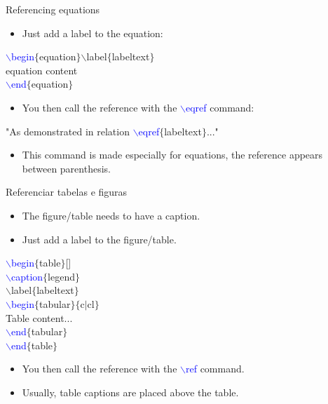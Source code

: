 \documentclass[usenames,dvipsnames,aspectratio=169]{beamer}
\newcommand{\aitem}{\item[$\cdot$]}
\begin{document}
\begin{frame}[t]{Referencing equations}
\begin{itemize}
\aitem Just add a label to the equation:
\end{itemize}
\textcolor{blue}{$\backslash$begin}\textcolor{PineGreen}{$\{$equation$\}$}\textcolor{YellowOrange}{$\backslash$label$\{$labeltext$\}$}\\
\textcolor{PineGreen}{equation content}\\
\textcolor{blue}{$\backslash$end}\textcolor{PineGreen}{$\{$equation$\}$}
\begin{itemize}
\aitem You then call the reference with the \textcolor{blue}{$\backslash$eqref} command:
\end{itemize}
"As demonstrated in relation \textcolor{blue}{$\backslash$eqref}\textcolor{PineGreen}{$\{$labeltext$\}$}..."
\begin{itemize}
\aitem This command is made especially for equations, the reference appears between parenthesis.
\end{itemize}
\end{frame}


\begin{frame}[t]{Referenciar tabelas e figuras}
\begin{itemize}
\aitem The figure/table needs to have a caption.
\aitem Just add a label to the figure/table.
\end{itemize}
\textcolor{blue}{$\backslash$begin}\textcolor{PineGreen}{$\{$table$\}$}[]\\
\textcolor{blue}{$\backslash$caption}\textcolor{PineGreen}{$\{$legend$\}$}\\
\textcolor{YellowOrange}{$\backslash$label$\{$labeltext$\}$}\\
\textcolor{blue}{$\backslash$begin}\textcolor{PineGreen}{$\{$tabular$\}$}\textcolor{PineGreen}{$\{$c$|$cl$\}$}\\
Table content...\\
\textcolor{blue}{$\backslash$end}\textcolor{PineGreen}{$\{$tabular$\}$}\\
\textcolor{blue}{$\backslash$end}\textcolor{PineGreen}{$\{$table$\}$}
\begin{itemize}
\aitem You then call the reference with the \textcolor{blue}{$\backslash$ref} command.
\aitem Usually, table captions are placed above the table.
\end{itemize}
\end{frame}
\end{document}
